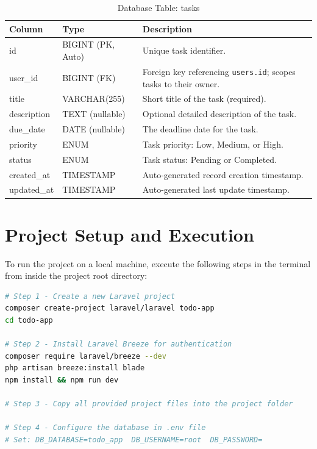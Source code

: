 \documentclass[12pt,a4paper]{report}
\begin{document}
\begin{titlepage}
\begin{table}[h!]
\centering
\caption{Database Table: tasks}
\label{tab:schema}
\renewcommand{\arraystretch}{1.3}
\begin{tabularx}{\textwidth}{@{}llX@{}}
\toprule
\textbf{Column} & \textbf{Type} & \textbf{Description} \\
\midrule
id          & BIGINT (PK, Auto) & Unique task identifier. \\
user\_id    & BIGINT (FK)       & Foreign key referencing \texttt{users.id}; scopes tasks to their owner. \\
title       & VARCHAR(255)      & Short title of the task (required). \\
description & TEXT (nullable)   & Optional detailed description of the task. \\
due\_date   & DATE (nullable)   & The deadline date for the task. \\
priority    & ENUM              & Task priority: Low, Medium, or High. \\
status      & ENUM              & Task status: Pending or Completed. \\
created\_at & TIMESTAMP         & Auto-generated record creation timestamp. \\
updated\_at & TIMESTAMP         & Auto-generated last update timestamp. \\
\bottomrule
\end{tabularx}
\end{table}

\section{Project Setup and Execution}

To run the project on a local machine, execute the following steps in the terminal
from inside the project root directory:

\begin{lstlisting}[language=bash, caption={Project Setup Commands}]
# Step 1 - Create a new Laravel project
composer create-project laravel/laravel todo-app
cd todo-app

# Step 2 - Install Laravel Breeze for authentication
composer require laravel/breeze --dev
php artisan breeze:install blade
npm install && npm run dev

# Step 3 - Copy all provided project files into the project folder

# Step 4 - Configure the database in .env file
# Set: DB_DATABASE=todo_app  DB_USERNAME=root  DB_PASSWORD=


\end{lstlisting}
\end{titlepage}
\end{document}
